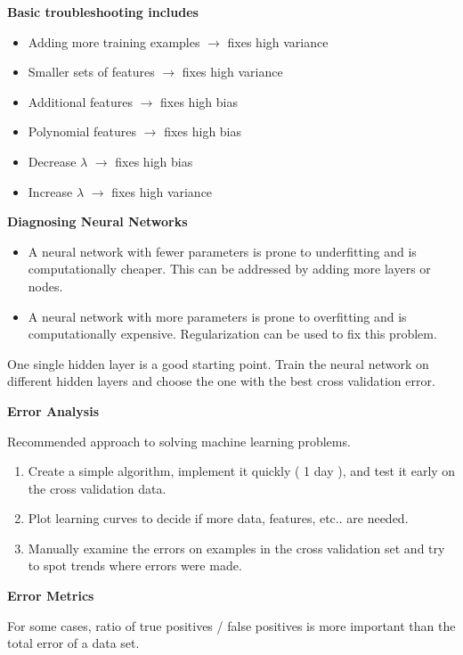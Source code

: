 \documentclass[
]{article}
\begin{document}
\textbf{Basic troubleshooting includes}

\begin{itemize}
\item
  Adding more training examples \(\rightarrow\) fixes high variance
\item
  Smaller sets of features \(\rightarrow\) fixes high variance
\item
  Additional features \(\rightarrow\) fixes high bias
\item
  Polynomial features \(\rightarrow\) fixes high bias
\item
  Decrease \(\lambda\) \(\rightarrow\) fixes high bias
\item
  Increase \(\lambda\) \(\rightarrow\) fixes high variance
\end{itemize}

\textbf{Diagnosing Neural Networks}

\begin{itemize}
\item
  A neural network with fewer parameters is prone to underfitting and is
  computationally cheaper. This can be addressed by adding more layers
  or nodes.
\item
  A neural network with more parameters is prone to overfitting and is
  computationally expensive. Regularization can be used to fix this
  problem.
\end{itemize}

One single hidden layer is a good starting point. Train the neural
network on different hidden layers and choose the one with the best
cross validation error.

\textbf{Error Analysis}

Recommended approach to solving machine learning problems.

\begin{enumerate}
\def\labelenumi{\arabic{enumi}.}
\item
  Create a simple algorithm, implement it quickly ( 1 day ), and test it
  early on the cross validation data.
\item
  Plot learning curves to decide if more data, features, etc.. are
  needed.
\item
  Manually examine the errors on examples in the cross validation set
  and try to spot trends where errors were made.
\end{enumerate}

\textbf{Error Metrics}

For some cases, ratio of true positives / false positives is more
important than the total error of a data set.
\end{document}
